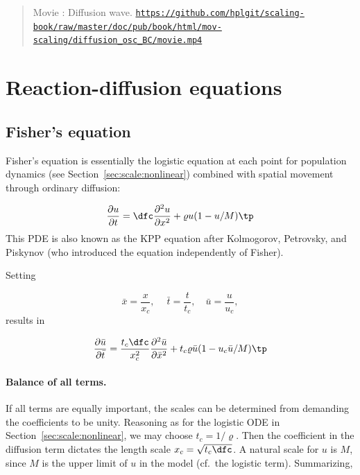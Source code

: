 \documentclass[graybox,envcountchap,sectrefs,final]{svmonodo}
\newenvironment{doconce:movie}{}{}
\newcounter{doconce:movie:counter}
\begin{document}
\begin{doconce:movie}
\begin{quote}
Movie : Diffusion wave. \href{https://github.com/hplgit/scaling-book/raw/master/doc/pub/book/html/mov-scaling/diffusion_osc_BC/movie.mp4}{\nolinkurl{https://github.com/hplgit/scaling-book/raw/master/doc/pub/book/html/mov-scaling/diffusion_osc_BC/movie.mp4}}
\end{quote}
\end{doconce:movie}




\section{Reaction-diffusion equations}
\label{sec:scale:diffu:Fisher}

\subsection{Fisher's equation}

Fisher's equation is essentially the logistic equation at each point
for population dynamics (see Section~\ref{sec:scale:nonlinear})
combined with spatial movement through ordinary diffusion:

\begin{equation}
\frac{\partial u}{\partial t} =
\dfc\frac{\partial^2 u}{\partial x^2} + \varrho u(1-u/M)
\tp
\label{sec:scale:diffu:Fisher:pde}
\end{equation}
This PDE is also known as the KPP equation after
Kolmogorov, Petrovsky, and Piskynov (who introduced the equation
independently of Fisher).

Setting

\[ \bar x = \frac{x}{x_c},\quad
\ \bar t = \frac{t}{t_c}, \quad\bar u =\frac{u}{u_c},\]
results in

\[
\frac{\partial \bar u}{\partial \bar t} =
\frac{t_c\dfc}{x_c^2}
\frac{\partial^2\bar u}{\partial\bar x^2} + t_c \varrho \bar u (1 - u_c\bar u/M)\tp
\]

\paragraph{Balance of all terms.}
If all terms are equally important, the scales can be determined from
demanding the coefficients to be unity.
Reasoning as for the logistic ODE in Section~\ref{sec:scale:nonlinear},
we may choose $t_c=1/\varrho$. Then
the coefficient in the diffusion term dictates the length scale $x_c =
\sqrt{t_c\dfc}$.
A natural scale for $u$ is $M$, since $M$ is the upper limit of $u$ in
the model (cf.~the logistic term). Summarizing,
\end{document}
